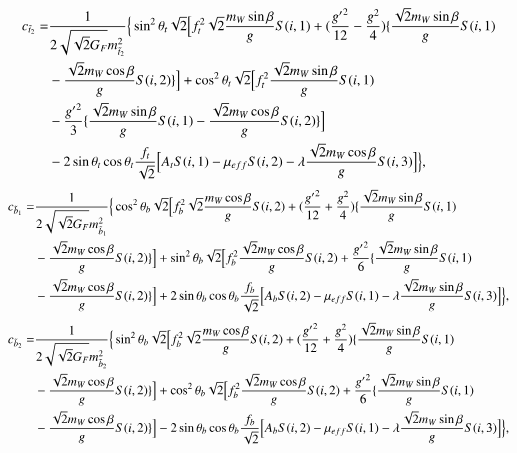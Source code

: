 \documentclass[final,3p,times,pdflatex]{elsarticle}
\begin{document}
\begin{equation}
\begin{aligned}
c_{\tilde{t}_2} = & {1 \over 2\sqrt{\sqrt{2}G_{F}} m_{\tilde{t}_2}^2}\Big\{\sin^2 \theta_t \sqrt{2}\Big[f_{t}^2 \sqrt{2} {m_{W} \sin\beta \over g} S(i,1) + ({{g'}^2 \over 12} - {g^2 \over 4}) \{{\sqrt{2} m_{W} \sin\beta \over g} S(i,1) \\ & -{\sqrt{2} m_{W} \cos\beta \over g}S(i,2)\}\Big] + \cos^2 \theta_t \sqrt{2} \Big[ f_{t}^2 {\sqrt{2} m_{W} \sin\beta \over g}S(i,1) \\ & - {{g'}^2 \over 3}\{{\sqrt{2} m_{W} \sin\beta \over g}S(i,1) - {\sqrt{2} m_{W} \cos\beta \over g} S(i,2)\}\Big] \\ & - 2\sin\theta_t \cos\theta_t {f_{t} \over \sqrt{2}}\Big[A_{t}S(i,1) - \mu_{eff}S(i,2) - \lambda {\sqrt{2} m_{W} \cos\beta \over g}S(i,3)\Big]\Big\},
\end{aligned}
\end{equation}
\begin{equation}
\begin{aligned}
c_{\tilde{b}_1} = & {1 \over 2\sqrt{\sqrt{2}G_{F}} m_{\tilde{b}_1}^2}\Big\{\cos^2 \theta_b \sqrt{2}\Big[f_{b}^2 \sqrt{2} {m_{W} \cos\beta \over g} S(i,2) + ({{g'}^2 \over 12} + {g^2 \over 4}) \{{\sqrt{2} m_{W} \sin\beta \over g} S(i,1) \\ & -{\sqrt{2} m_{W} \cos\beta \over g}S(i,2)\}\Big] + \sin^2 \theta_b \sqrt{2} \Big[ f_{b}^2 {\sqrt{2} m_{W} \cos\beta \over g}S(i,2) + {{g'}^2 \over 6}\{{\sqrt{2} m_{W} \sin\beta \over g}S(i,1) \\ & - {\sqrt{2} m_{W} \cos\beta \over g} S(i,2)\}\Big] + 2\sin\theta_b \cos\theta_b {f_{b} \over \sqrt{2}}\Big[A_{b}S(i,2) - \mu_{eff}S(i,1) - \lambda {\sqrt{2} m_{W} \sin\beta \over g}S(i,3)\Big]\Big\},
\end{aligned}
\end{equation}
\begin{equation}
\begin{aligned}
c_{\tilde{b}_2} = & {1 \over 2\sqrt{\sqrt{2}G_{F}} m_{\tilde{b}_2}^2}\Big\{\sin^2 \theta_b \sqrt{2}\Big[f_{b}^2 \sqrt{2} {m_{W} \cos\beta \over g} S(i,2) + ({{g'}^2 \over 12} + {g^2 \over 4}) \{{\sqrt{2} m_{W} \sin\beta \over g} S(i,1) \\ & -{\sqrt{2} m_{W} \cos\beta \over g}S(i,2)\}\Big] + \cos^2 \theta_b \sqrt{2} \Big[ f_{b}^2 {\sqrt{2} m_{W} \cos\beta \over g}S(i,2) + {{g'}^2 \over 6}\{{\sqrt{2} m_{W} \sin\beta \over g}S(i,1) \\ & - {\sqrt{2} m_{W} \cos\beta \over g} S(i,2)\}\Big] - 2\sin\theta_b \cos\theta_b {f_{b} \over \sqrt{2}}\Big[A_{b}S(i,2) - \mu_{eff}S(i,1) - \lambda {\sqrt{2} m_{W} \sin\beta \over g}S(i,3)\Big]\Big\},
\end{aligned}
\end{equation}
\end{document}

